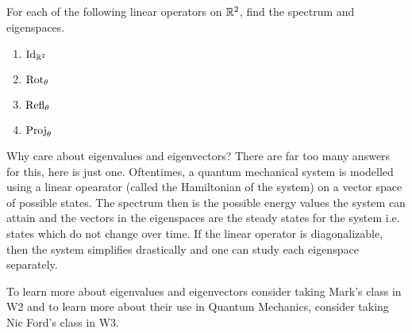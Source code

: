 \begin{qbox}
  For each of the following linear operators on $\mathbb{R}^2$, find the spectrum and eigenspaces.
  \begin{multicols}{2}
    \begin{enumerate}
      \item $\operatorname{Id}_{\mathbb{R}^2}$
      \item $\mathrm{Rot}_{\theta}$
      \item $\mathrm{Refl}_{\theta}$
      \item $\mathrm{Proj}_{\theta}$
    \end{enumerate}
  \end{multicols}
\end{qbox}

Why care about eigenvalues and eigenvectors?
There are far too many answers for this, here is just one.
Oftentimes, a quantum mechanical system is modelled using a linear opearator (called the Hamiltonian of the system) on a vector space of possible states.
The spectrum then is the possible energy values the system can attain and the vectors in the eigenspaces are the steady states for the system i.e. states which do not change over time.
If the linear operator is diagonalizable, then the system simplifies drastically and one can study each eigenspace separately.

To learn more about eigenvalues and eigenvectors consider taking Mark's class in W2 and to learn more about their use in Quantum Mechanics, consider taking Nic Ford's class in W3.

